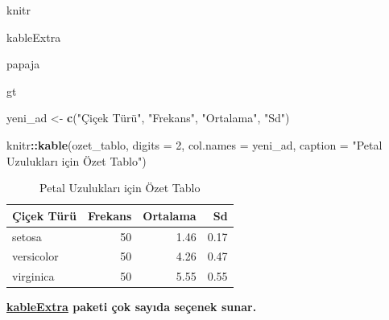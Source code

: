 \documentclass[
  oneside]{book}
\newenvironment{Shaded}{\begin{snugshade}}{\end{snugshade}}
\newcommand{\AttributeTok}[1]{\textcolor[rgb]{0.13,0.29,0.53}{#1}}
\newcommand{\DecValTok}[1]{\textcolor[rgb]{0.00,0.00,0.81}{#1}}
\newcommand{\FunctionTok}[1]{\textcolor[rgb]{0.13,0.29,0.53}{\textbf{#1}}}
\newcommand{\NormalTok}[1]{#1}
\newcommand{\OtherTok}[1]{\textcolor[rgb]{0.56,0.35,0.01}{#1}}
\newcommand{\SpecialCharTok}[1]{\textcolor[rgb]{0.81,0.36,0.00}{\textbf{#1}}}
\newcommand{\StringTok}[1]{\textcolor[rgb]{0.31,0.60,0.02}{#1}}
\begin{document}
knitr

kableExtra

papaja

gt

\hypertarget{knitr}{}
\begin{Shaded}
\begin{Highlighting}[]
\NormalTok{yeni\_ad }\OtherTok{\textless{}{-}} \FunctionTok{c}\NormalTok{(}\StringTok{"Çiçek Türü"}\NormalTok{, }\StringTok{"Frekans"}\NormalTok{, }\StringTok{"Ortalama"}\NormalTok{, }\StringTok{"Sd"}\NormalTok{)}

\NormalTok{knitr}\SpecialCharTok{::}\FunctionTok{kable}\NormalTok{(ozet\_tablo,}
             \AttributeTok{digits =} \DecValTok{2}\NormalTok{,}
             \AttributeTok{col.names =}\NormalTok{ yeni\_ad,}
             \AttributeTok{caption =} \StringTok{"Petal Uzulukları için Özet Tablo"}\NormalTok{)}
\end{Highlighting}
\end{Shaded}

\begin{table}

\caption{\label{tab:kable-demo}Petal Uzulukları için Özet Tablo}
\centering
\begin{tabular}[t]{l|r|r|r}
\hline
Çiçek Türü & Frekans & Ortalama & Sd\\
\hline
setosa & 50 & 1.46 & 0.17\\
\hline
versicolor & 50 & 4.26 & 0.47\\
\hline
virginica & 50 & 5.55 & 0.55\\
\hline
\end{tabular}
\end{table}

\leavevmode{}%
\textbf{\href{https://haozhu233.github.io/kableExtra/awesome_table_in_html.html}{kableExtra} paketi çok sayıda seçenek sunar.}
\end{document}
